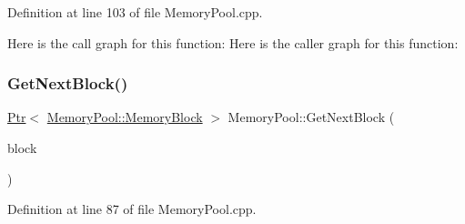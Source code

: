 Definition at line 103 of file Memory\+Pool.\+cpp.


\begin{DoxyCode}{0}

\end{DoxyCode}
Here is the call graph for this function\+:
Here is the caller graph for this function\+:
\mbox{\label{classpdl_1_1memory_1_1_memory_pool_a9125f620065a5e400081a300b8d4739b}} 
\subsubsection{\texorpdfstring{GetNextBlock()}{GetNextBlock()}}
{\footnotesize\ttfamily \mbox{\hyperlink{classpdl_1_1memory_1_1_ptr}{Ptr}}$<$ \mbox{\hyperlink{classpdl_1_1memory_1_1_memory_pool_ae6b2ec19cb71cae4fa60b7d342a1743b}{Memory\+Pool\+::\+Memory\+Block}} $>$ Memory\+Pool\+::\+Get\+Next\+Block (\begin{DoxyParamCaption}\item[{\mbox{\hyperlink{classpdl_1_1memory_1_1_ptr}{Ptr}}$<$ \mbox{\hyperlink{classpdl_1_1memory_1_1_memory_pool_ae6b2ec19cb71cae4fa60b7d342a1743b}{Memory\+Block}} $>$}]{block }\end{DoxyParamCaption})\hspace{0.3cm}{\ttfamily [private]}}



Definition at line 87 of file Memory\+Pool.\+cpp.



